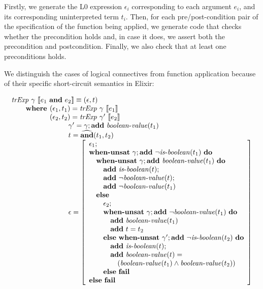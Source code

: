 Firstly, we generate the L0 expression $\epsilon_i$ corresponding to each 
argument $e_i$, and its corresponding uninterpreted term $t_i$. Then, for 
each pre/post-condition pair of the specification of the function being
applied, we generate code that checks whether the precondition holds and, 
in case it does, we assert both the precondition and postcondition. Finally,
we also check that at least one preconditions holds.

We distinguish the cases of logical connectives from function application
because of their specific short-circuit semantics in Elixir:

\[
\begin{array}{l}
\trExp{\gamma}{\andE{e_1}{e_2}} \equiv (\epsilon, t)\\
\qquad \textbf{where }(\epsilon_1, t_1) = \trExp{\gamma}{e_1}\\
\qquad \phantom{\textbf{where }}(\epsilon_2, t_2) = \trExp{\gamma'}{e_2}\\
\qquad\qquad\qquad\qquad \gamma' = \gamma;\addE~\booleanvalue{t_1}\\
\qquad\qquad\qquad\qquad t = \widehat{\mathbf{and}}(t_1, t_2)\\
\qquad\qquad\qquad\qquad \epsilon = \left[ 
\begin{array}{l}
\epsilon_1;\\
\whenUnsatW~\gamma;\addE~\neg\isboolean{t_1}~\doW\\
\quad\whenUnsatW~\gamma;\addE~\booleanvalue{t_1}~\doW\\
\quad\quad\addE~\isboolean{t};\\
\quad\quad\addE~\neg\booleanvalue{t};\\
\quad\quad\addE~\neg\booleanvalue{t_1}\\
\quad\elseW\\
\quad\quad\epsilon_2;\\
\quad\quad\whenUnsatW~\gamma;\addE~\neg\booleanvalue{t_1}~\doW\\
\quad\quad\quad\addE~\booleanvalue{t_1}\\
\quad\quad\quad\addE~t = t_2\\
\quad\quad\elseW~\whenUnsatW~\gamma';\addE~\neg\isboolean{t_2}~\doW\\
\quad\quad\quad\addE~\isboolean{t};\\
\quad\quad\quad\addE~\booleanvalue{t} = \\
\quad\quad\quad\quad(\booleanvalue{t_1} \land \booleanvalue{t_2})\\
\quad\quad\elseW~\failE\\
\elseW~\failE
\end{array}
\right] \\
\end{array}
\]

